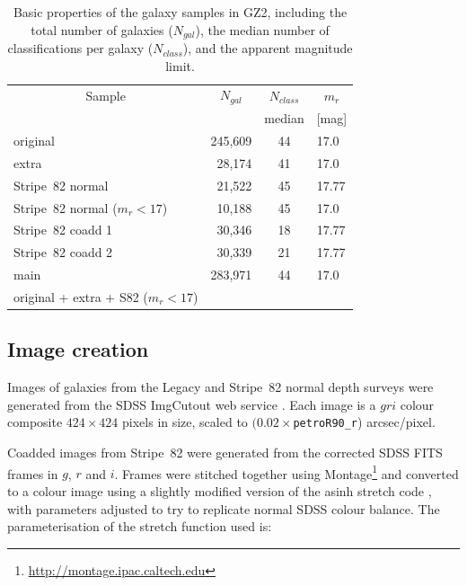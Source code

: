 \documentclass[useAMS,usenatbib]{mn2e}
\begin{document}
\begin{table}
 \begin{tabular}{@{}lrcl}
 \hline
\multicolumn{1}{c}{Sample} &
\multicolumn{1}{c}{$N_{gal}$} &
\multicolumn{1}{c}{$N_{class}$} &
\multicolumn{1}{c}{$m_r$} 
\\ 
\multicolumn{1}{c}{} &
\multicolumn{1}{c}{} &
\multicolumn{1}{c}{median} &
\multicolumn{1}{c}{[mag]} 
\\ 
\hline
\hline						%
original                       & 245,609 & 44  & 17.0   \\     %
extra                          &  28,174 & 41  & 17.0   \\     %
Stripe~82 normal               &  21,522 & 45  & 17.77  \\     %
Stripe~82 normal ($m_r<17$)      &  10,188 & 45  & 17.0   \\     %
Stripe~82 coadd 1              &  30,346 & 18  & 17.77  \\     %
Stripe~82 coadd 2              &  30,339 & 21  & 17.77  \\     %
\hline
main                           & 283,971 & 44  & 17.0   \\     %
original + extra + S82 ($m_r<17$) & \\
\hline
 \end{tabular}
 \caption{Basic properties of the galaxy samples in GZ2, including the total number of galaxies ($N_{gal}$), the median number of classifications per galaxy ($N_{class}$), and the apparent magnitude limit. \label{tbl-sample}}
\end{table}

\subsection{Image creation}\label{ssec-imagecreation}

Images of galaxies from the Legacy and Stripe~82 normal depth surveys were generated from the SDSS ImgCutout web service \citep{nie04}. Each image is a $gri$ colour composite $424\times424$ pixels in size, scaled to $(0.02\times${\tt petroR90\_r}) arcsec/pixel.

Coadded images from Stripe~82 were generated from the corrected SDSS FITS frames in $g$, $r$ and $i$. Frames were stitched together using Montage\footnote{\url{http://montage.ipac.caltech.edu}} and converted to a colour image using a slightly modified version of the asinh stretch code \citep{lup04}, with parameters adjusted to try to replicate normal SDSS colour balance. The parameterisation of the stretch function used is:
\end{document}
